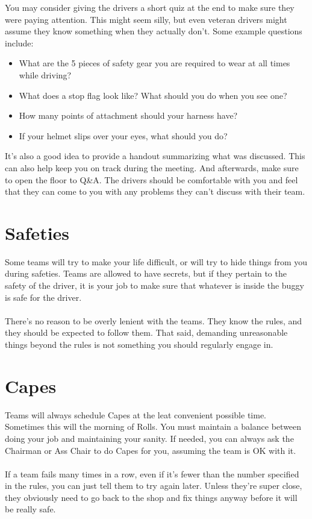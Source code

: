 You may consider giving the drivers a short quiz at the end to make sure they
were paying attention. This might seem silly, but even veteran drivers might
assume they know something when they actually don't. Some example questions
include:
\begin{itemize}
\item What are the 5 pieces of safety gear you are required to wear at all
times while driving?
\item What does a stop flag look like? What should you do when you see one?
\item How many points of attachment should your harness have?
\item If your helmet slips over your eyes, what should you do?
\end{itemize}

It's also a good idea to provide a handout summarizing what was discussed.
This can also help keep you on track during the meeting. And afterwards,
make sure to open the floor to Q\&A. The drivers should be comfortable with
you and feel that they can come to you with any problems they can't discuss
with their team.

\section{Safeties}
\label{sec:Safeties}
Some teams will try to make your life difficult, or will try to hide things
from you during safeties. Teams are allowed to have secrets, but if they
pertain to the safety of the driver, it is your job to make sure that whatever
is inside the buggy is safe for the driver.
\\\\
There's no reason to be overly lenient with the teams. They know the rules,
and they should be expected to follow them. That said, demanding unreasonable
things beyond the rules is not something you should regularly engage in.

\section{Capes}
\label{sec:Capes}
Teams will always schedule Capes at the leat convenient possible time.
Sometimes this will the morning of Rolls. You must maintain a balance
between doing your job and maintaining your sanity. If needed, you can
always ask the Chairman or Ass Chair to do Capes for you, assuming the
team is OK with it.
\\\\
If a team fails many times in a row, even if it's fewer than the number
specified in the rules, you can just tell them to try again later. Unless
they're super close, they obviously need to go back to the shop and fix
things anyway before it will be really safe.

